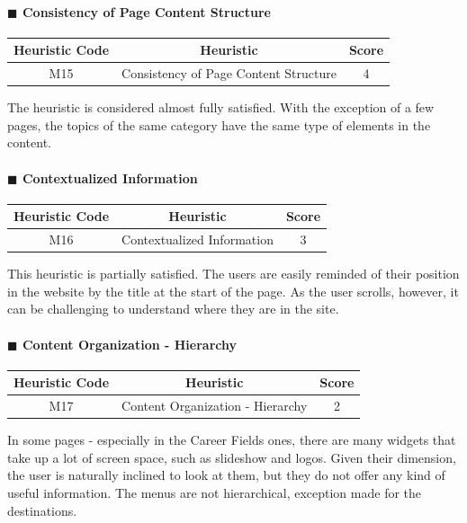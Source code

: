 \documentclass[11pt]{article} %
\begin{document}
\paragraph{$\blacksquare$ Consistency of Page Content Structure}
\begin{center}
    \begin{tabular}{|c|c|c|} 
    \hline
    \textbf{Heuristic Code} & \textbf{Heuristic} & \textbf{Score}\\ 
    \hline
    M15 & Consistency of Page Content Structure & 4 \\
    \hline
    \end{tabular}
\end{center}
The heuristic is considered almost fully satisfied. With the exception of a few pages, the topics of the same category have the same type of elements in the content. 

\paragraph{$\blacksquare$ Contextualized Information}
\begin{center}
    \begin{tabular}{|c|c|c|} 
    \hline
    \textbf{Heuristic Code} & \textbf{Heuristic} & \textbf{Score}\\ 
    \hline
    M16 & Contextualized Information & 3 \\
    \hline
    \end{tabular}
\end{center}
This heuristic is partially satisfied. The users are easily reminded of their position in the website by the title at the start of the page. As the user scrolls, however, it can be challenging to understand where they are in the site.

\paragraph{$\blacksquare$ Content Organization - Hierarchy}
\begin{center}
    \begin{tabular}{|c|c|c|} 
    \hline
    \textbf{Heuristic Code} & \textbf{Heuristic} & \textbf{Score}\\ 
    \hline
    M17 & Content Organization - Hierarchy & 2 \\
    \hline
    \end{tabular}
\end{center}
In some pages - especially in the Career Fields ones, there are many widgets that take up a lot of screen space, such as slideshow and logos. Given their dimension, the user is naturally inclined to look at them, but they do not offer any kind of useful information. 
The menus are not hierarchical, exception made for the destinations. 
\end{document}
